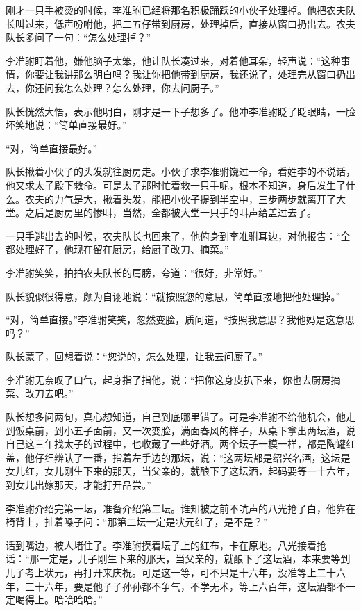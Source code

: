 刚才一只手被烫的时候，李准驸已经将那名积极踊跃的小伙子处理掉。他把农夫队长叫过来，低声吩咐他，把二五仔带到厨房，处理掉后，直接从窗口扔出去。农夫队长多问了一句：“怎么处理掉？”

李准驸盯着他，嫌他脑子太笨，他让队长凑过来，对着他耳朵，轻声说：“这种事情，你要让我讲那么明白吗？我让你把他带到厨房，我还说了，处理完从窗口扔出去，你还问我怎么处理？怎么处理，你去问厨子。”

队长恍然大悟，表示他明白，刚才是一下子想多了。他冲李准驸眨了眨眼睛，一脸坏笑地说：“简单直接最好。”

“对，简单直接最好。”

队长揪着小伙子的头发就往厨房走。小伙子求李准驸饶过一命，看姓李的不说话，他又求太子殿下救命。可是太子那时忙着救一只手呢，根本不知道，身后发生了什么。农夫的力气是大，揪着头发，能把小伙子提到半空中，三步两步就离开了大堂。之后是厨房里的惨叫，当然，全都被大堂一只手的叫声给盖过去了。

一只手逃出去的时候，农夫队长也回来了，他俯身到李准驸耳边，对他报告：“全都处理好了，他现在留在厨房，给厨子改刀、摘菜。”

李准驸笑笑，拍拍农夫队长的肩膀，夸道：“很好，非常好。”

队长貌似很得意，颇为自诩地说：“就按照您的意思，简单直接地把他处理掉。”

“对，简单直接。”李准驸笑笑，忽然变脸，质问道，“按照我意思？我他妈是这意思吗？”

队长蒙了，回想着说：“您说的，怎么处理，让我去问厨子。”

李准驸无奈叹了口气，起身指了指他，说：“把你这身皮扒下来，你也去厨房摘菜、改刀去吧。”

队长想多问两句，真心想知道，自己到底哪里错了。可是李准驸不给他机会，他走到饭桌前，到小五子面前，又一次变脸，满面春风的样子，从桌下拿出两坛酒，说自己这三年找太子的过程中，也收藏了一些好酒。两个坛子一模一样，都是陶罐红盖，他仔细辨认了一番，指着左手边的那坛，说：“这两坛都是绍兴名酒，这坛是女儿红，女儿刚生下来的那天，当父亲的，就酿下了这坛酒，起码要等一十六年，到女儿出嫁那天，才能打开品尝。”

李准驸介绍完第一坛，准备介绍第二坛。谁知被之前不吭声的八光抢了白，他靠在椅背上，扯着嗓子问：“那第二坛一定是状元红了，是不是？”

话到嘴边，被人堵住了。李准驸摸着坛子上的红布，卡在原地。八光接着抢话：“那一定是，儿子刚生下来的那天，当父亲的，就酿下了这坛酒，本来要等到儿子考上状元，再打开来庆祝。可是这一等，可不只是十六年，没准等上二十六年，三十六年，要是他子子孙孙都不争气，不学无术，等上六百年，这坛酒都不一定喝得上。哈哈哈哈。”

